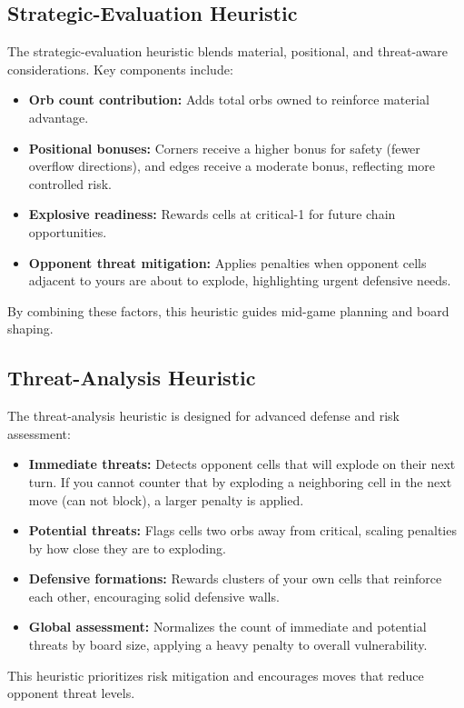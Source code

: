 \documentclass[12pt]{article}
\begin{document}
\subsection{Strategic-Evaluation Heuristic}
The strategic-evaluation heuristic blends material, positional, and threat-aware considerations. Key components include:
\begin{itemize}
  \item \textbf{Orb count contribution:} Adds total orbs owned to reinforce material advantage.
  \item \textbf{Positional bonuses:} Corners receive a higher bonus for safety (fewer overflow directions), and edges receive a moderate bonus, reflecting more controlled risk.
  \item \textbf{Explosive readiness:} Rewards cells at critical-1 for future chain opportunities.
  \item \textbf{Opponent threat mitigation:} Applies penalties when opponent cells adjacent to yours are about to explode, highlighting urgent defensive needs.
\end{itemize}
By combining these factors, this heuristic guides mid-game planning and board shaping.

\subsection{Threat-Analysis Heuristic}
The threat-analysis heuristic is designed for advanced defense and risk assessment:
\begin{itemize}
  \item \textbf{Immediate threats:} Detects opponent cells that will explode on their next turn. If you cannot counter that by exploding a neighboring cell in the next move (can not block), a larger penalty is applied.
  \item \textbf{Potential threats:} Flags cells two orbs away from critical, scaling penalties by how close they are to exploding.
  \item \textbf{Defensive formations:} Rewards clusters of your own cells that reinforce each other, encouraging solid defensive walls.
  \item \textbf{Global assessment:} Normalizes the count of immediate and potential threats by board size, applying a heavy penalty to overall vulnerability.
\end{itemize}
This heuristic prioritizes risk mitigation and encourages moves that reduce opponent threat levels.
\end{document}
